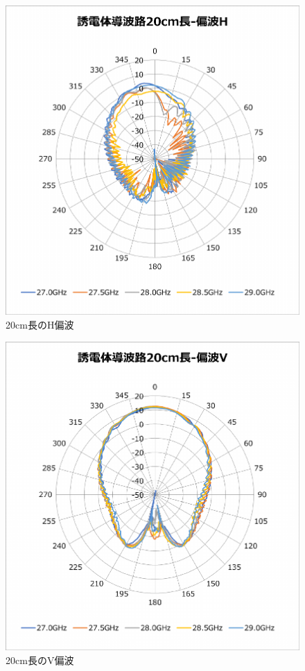 \documentclass[technicalreport]{ieicej}
\begin{document}
\begin{figure}[tb]
  \begin{center}
    \includegraphics[bb=0 0 408 430, width=0.9\linewidth]{img/waveguide-20cm-h.pdf}
    \caption{20cm長のH偏波}
    \label{fig:20cm-h}
  \end{center}
\end{figure}

\begin{figure}[tb]
  \begin{center}
    \includegraphics[bb=0 0 408 430, width=0.9\linewidth]{img/waveguide-20cm-v.pdf}
    \caption{20cm長のV偏波}
    \label{fig:20cm-v}
  \end{center}
\end{figure}
\end{document}
